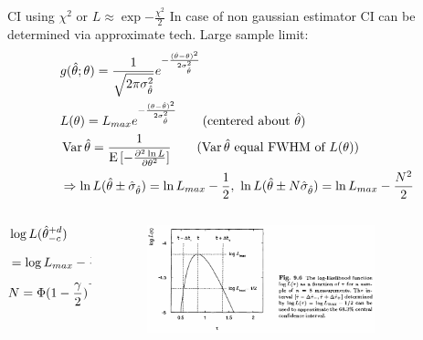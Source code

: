 \documentclass[asd-beamer.tex]{subfiles}%
\begin{document}
    \begin{frame}{CI using $\chi^2$ or $L\approx\exp{-\frac{\chi^2}{2}}$}
        In case of non gaussian estimator CI can be determined via approximate tech. Large sample limit:
        \begin{align*}
            &g(\hat{\theta};\theta)=\frac{1}{\sqrt{2\pi\sigma_{\hat{\theta}}^2}}\exp{-\frac{(\hat{\theta}-\theta)^2}{2\sigma_{\hat{\theta}}^2}}\\
            &L(\theta)=L_{max}\exp{-\frac{(\theta-\hat{\theta})^2}{2\sigma_{\hat{\theta}}^2}}\tag{centered about $\hat{\theta}$}\\
            &\var{\hat{\theta}}=\frac{1}{\E{[-\PtwoDy{\theta}{\ln{L}}]}}\tag{$\var{\hat{\theta}}$ equal FWHM of $L(\theta)$}\\
            &\Rightarrow\ln{L(\hat{\theta}\pm\hat{\sigma}_{\hat{\theta}})}=\ln{L_{max}}-\frac{1}{2},\ \ln{L(\hat{\theta}\pm N\hat{\sigma}_{\hat{\theta}})}=\ln{L_{max}}-\frac{N^2}{2}
        \end{align*}
        \begin{columns}[T]
            \begin{column}{0.3\textwidth}
                \begin{align*}
                    &\log{L(\hat{\theta}^{+d}_{-c})}\\
                    &=\log{L_{max}}-\frac{N^2}{2}\\
                    &N=\invers{\Phi(1-\frac{\gamma}{2})},\ \cl{}=1-\gamma
                \end{align*}
            \end{column}
            \begin{column}{0.7\textwidth}
                \begin{figure}[!ht]\includegraphics[trim={0cm 0cm 0 0},clip,keepaspectratio,width=0.8\textwidth]{figures/cowan/estimators/CIapproxlargesample}\label{fig:CIapproxlargesample}\end{figure}
            \end{column}
        \end{columns}
    \end{frame}
\end{document}
